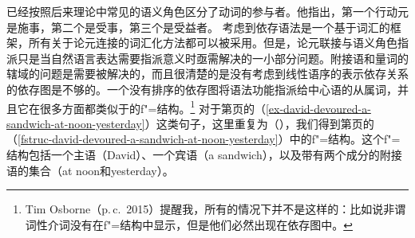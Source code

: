 \tes 已经按照后来理论中常见的语义角色区分了动词的参与者。他指出，第一个行动元是施事，第二个是受事，第三个是受益者\citep[\S~106]{Tesniere2015a-not-crossreferenced}。
考虑到依存语法是一个基于词汇的框架，所有关于论元连接的词汇化方法都可以被采用。但是，论元联接与语义角色指派只是当自然语言表达需要指派意义时亟需解决的一小部分问题。附接语和量词的辖域的问题是需要被解决的，而且很清楚的是没有考虑到线性语序的表示依存关系的依存图是不够的。一个没有排序的依存图将语法功能指派给中心语的从属词，并且它在很多方面都类似于\lfgc 的f"=结构。\footnote{
Tim Osborne（p.\,c.\ 2015）提醒我，所有的情况下并不是这样的：比如说非谓词性介词没有在f"=结构中显示，但是他们必然出现在依存图中。
} 对于第\pageref{ex-david-devoured-a-sandwich-at-noon-yesterday}页的（\ref{ex-david-devoured-a-sandwich-at-noon-yesterday}）这类句子，这里重复为（），我们得到第\pageref{fstruc-david-devoured-a-sandwich-at-noon-yesterday}页的（\ref{fstruc-david-devoured-a-sandwich-at-noon-yesterday}）中的f"=结构。这个f"=结构包括一个主语（David）、一个宾语（a sandwich），以及带有两个成分的附接语的集合（at noon和yesterday）。
